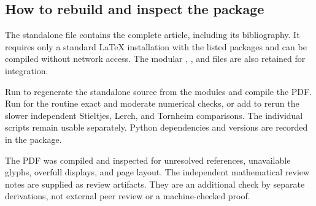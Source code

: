 \subsection{How to rebuild and inspect the package}

The standalone file
contains the complete article, including its bibliography.
It requires only a standard LaTeX installation with the
listed packages and can be compiled without network access.
The modular , , and
 files are also retained for integration.

Run  to regenerate the standalone
source from the modules and compile the PDF.
Run  for the routine
exact and moderate numerical checks, or add 
to rerun the slower independent Stieltjes, Lerch, and
Tornheim comparisons. The individual scripts remain
usable separately. Python dependencies and versions
are recorded in the package.

The PDF was compiled and inspected for unresolved references,
unavailable glyphs, overfull displays, and page layout.
The independent mathematical review notes are supplied
as review artifacts. They are an additional check by
separate derivations, not external peer review or a
machine-checked proof.
